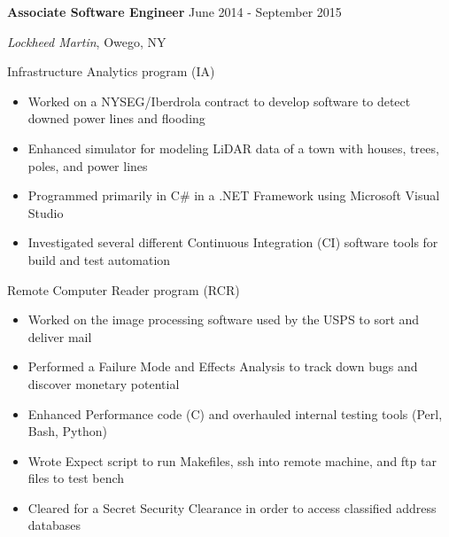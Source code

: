 

\vspace{5pt}

\textbf{Associate Software Engineer} \hfill June 2014 - September 2015

\textit{Lockheed Martin}, Owego, NY

\vspace{3pt}

Infrastructure Analytics program (IA)

\begin{itemize}
    \item Worked on a NYSEG/Iberdrola contract to develop software to detect downed power lines and flooding
    \item Enhanced simulator for modeling LiDAR data of a town with houses, trees, poles, and power lines
    \item Programmed primarily in C\# in a .NET Framework using Microsoft Visual Studio
    \item Investigated several different Continuous Integration (CI) software tools for build and test automation
\end{itemize}

\vspace{3pt}

Remote Computer Reader program (RCR)

\begin{itemize}
    \item Worked on the image processing software used by the USPS to sort and deliver mail
    \item Performed a Failure Mode and Effects Analysis to track down bugs and discover monetary potential
    \item Enhanced Performance code (C) and overhauled internal testing tools (Perl, Bash, Python)
    \item Wrote Expect script to run Makefiles, ssh into remote machine, and ftp tar files to test bench
    \item Cleared for a Secret Security Clearance in order to access classified address databases
\end{itemize}
